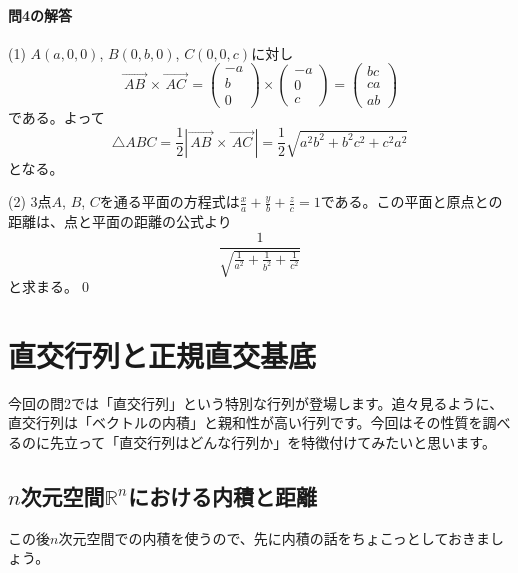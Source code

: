 \paragraph{問4の解答}

\noindent (1)
$A(a, 0, 0)$, $B(0, b, 0)$, $C(0, 0, c)$に対し
\[
\overrightarrow{\, AB\, } \times \overrightarrow{\, AC\, }
=
\begin{pmatrix}
-a \\
b \\
0
\end{pmatrix}
\times
\begin{pmatrix}
-a \\
0 \\
c
\end{pmatrix}
=
\begin{pmatrix}
bc \\
ca \\
ab
\end{pmatrix}
\]
である。よって
\[
\triangle ABC = \frac{1}{2}|\overrightarrow{\,AB\,}\times\overrightarrow{\,AC\,}| = \frac{1}{2}\sqrt{a^2 b^2 + b^2 c^2 + c^2 a^2}
\]
となる。

\noindent (2) $3$点$A$, $B$, $C$を通る平面の方程式は$\frac{x}{a} + \frac{y}{b} + \frac{z}{c} = 1$である。この平面と原点との距離は、点と平面の距離の公式より
\[
\frac{1}{\sqrt{\frac{1}{a^2} + \frac{1}{b^2} + \frac{1}{c^2}}}
\]
と求まる。\qed

\section{直交行列と正規直交基底}

今回の問2では「直交行列」という特別な行列が登場します。追々見るように、直交行列は「ベクトルの内積」と親和性が高い行列です。今回はその性質を調べるのに先立って「直交行列はどんな行列か」を特徴付けてみたいと思います。

\subsection{$n$次元空間$\mathbb{R}^n$における内積と距離}

この後$n$次元空間での内積を使うので、先に内積の話をちょこっとしておきましょう。

